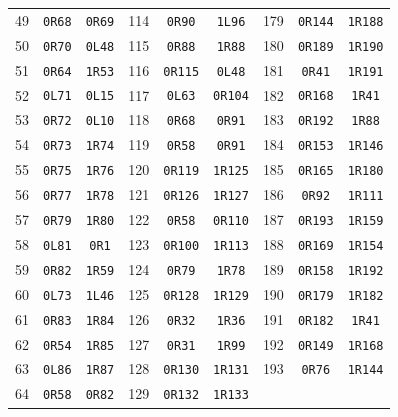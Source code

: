 \documentclass[10pt,a4paper]{article}
\begin{document}
\begin{center}
\begin{tabular}{rcc@{\hspace{14pt}}rcc@{\hspace{14pt}}rcc}
49 & \texttt{0R68} & \texttt{0R69} & 114 & \texttt{0R90} & \texttt{1L96} & 179 & \texttt{0R144} & \texttt{1R188} \\
50 & \texttt{0R70} & \texttt{0L48} & 115 & \texttt{0R88} & \texttt{1R88} & 180 & \texttt{0R189} & \texttt{1R190} \\
51 & \texttt{0R64} & \texttt{1R53} & 116 & \texttt{0R115} & \texttt{0L48} & 181 & \texttt{0R41} & \texttt{1R191} \\
52 & \texttt{0L71} & \texttt{0L15} & 117 & \texttt{0L63} & \texttt{0R104} & 182 & \texttt{0R168} & \texttt{1R41} \\
53 & \texttt{0R72} & \texttt{0L10} & 118 & \texttt{0R68} & \texttt{0R91} & 183 & \texttt{0R192} & \texttt{1R88} \\
54 & \texttt{0R73} & \texttt{1R74} & 119 & \texttt{0R58} & \texttt{0R91} & 184 & \texttt{0R153} & \texttt{1R146} \\
55 & \texttt{0R75} & \texttt{1R76} & 120 & \texttt{0R119} & \texttt{1R125} & 185 & \texttt{0R165} & \texttt{1R180} \\
56 & \texttt{0R77} & \texttt{1R78} & 121 & \texttt{0R126} & \texttt{1R127} & 186 & \texttt{0R92} & \texttt{1R111} \\
57 & \texttt{0R79} & \texttt{1R80} & 122 & \texttt{0R58} & \texttt{0R110} & 187 & \texttt{0R193} & \texttt{1R159} \\
58 & \texttt{0L81} & \texttt{0R1} & 123 & \texttt{0R100} & \texttt{1R113} & 188 & \texttt{0R169} & \texttt{1R154} \\
59 & \texttt{0R82} & \texttt{1R59} & 124 & \texttt{0R79} & \texttt{1R78} & 189 & \texttt{0R158} & \texttt{1R192} \\
60 & \texttt{0L73} & \texttt{1L46} & 125 & \texttt{0R128} & \texttt{1R129} & 190 & \texttt{0R179} & \texttt{1R182} \\
61 & \texttt{0R83} & \texttt{1R84} & 126 & \texttt{0R32} & \texttt{1R36} & 191 & \texttt{0R182} & \texttt{1R41} \\
62 & \texttt{0R54} & \texttt{1R85} & 127 & \texttt{0R31} & \texttt{1R99} & 192 & \texttt{0R149} & \texttt{1R168} \\
63 & \texttt{0L86} & \texttt{1R87} & 128 & \texttt{0R130} & \texttt{1R131} & 193 & \texttt{0R76} & \texttt{1R144} \\
64 & \texttt{0R58} & \texttt{0R82} & 129 & \texttt{0R132} & \texttt{1R133} &  &  &  \\
\bottomrule\end{tabular}\end{center}
\end{document}
